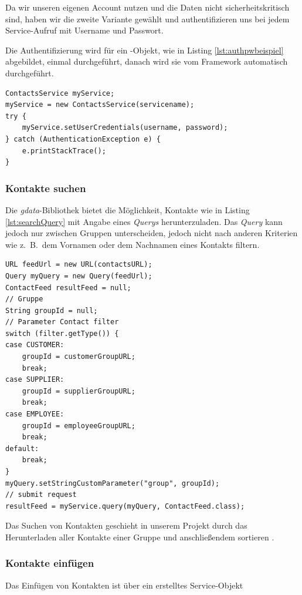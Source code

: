 Da wir unseren eigenen Account nutzen und die Daten nicht sicherheitskritisch sind, haben
 wir die zweite Variante gew\"ahlt und authentifizieren uns bei jedem Service-Aufruf mit
 Username und Passwort.

Die Authentifizierung wird für ein -Objekt, wie in Listing
 \ref{lst:authpwbeispiel} abgebildet, einmal durchgeführt, danach wird sie vom Framework
 automatisch durchgeführt.

\begin{lstlisting}[float]
ContactsService myService;
myService = new ContactsService(servicename);
try {
	myService.setUserCredentials(username, password);
} catch (AuthenticationException e) {
	e.printStackTrace();
}
\end{lstlisting}

\subsubsection{Kontakte suchen}
Die \emph{gdata}-Bibliothek bietet die Möglichkeit, Kontakte wie in Listing \ref{lst:searchQuery}
 mit Angabe eines \emph{Querys} herunterzuladen.
Das \emph{Query} kann jedoch nur zwischen Gruppen unterscheiden, jedoch nicht nach anderen
 Kriterien wie z.\ B.\ dem Vornamen oder dem Nachnamen eines Kontakts filtern.

\begin{lstlisting}[float]
URL feedUrl = new URL(contactsURL);
Query myQuery = new Query(feedUrl);
ContactFeed resultFeed = null;
// Gruppe
String groupId = null;
// Parameter Contact filter
switch (filter.getType()) {
case CUSTOMER:
	groupId = customerGroupURL;
	break;
case SUPPLIER:
	groupId = supplierGroupURL;
	break;
case EMPLOYEE:
	groupId = employeeGroupURL;
	break;
default:
	break;
}
myQuery.setStringCustomParameter("group", groupId);
// submit request
resultFeed = myService.query(myQuery, ContactFeed.class);
\end{lstlisting}

Das Suchen von Kontakten geschieht in unserem Projekt durch das Herunterladen aller Kontakte
 einer Gruppe und anschließendem sortieren .

\subsubsection{Kontakte einf\"ugen}
Das Einfügen von Kontakten ist über ein erstelltes Service-Objekt 

